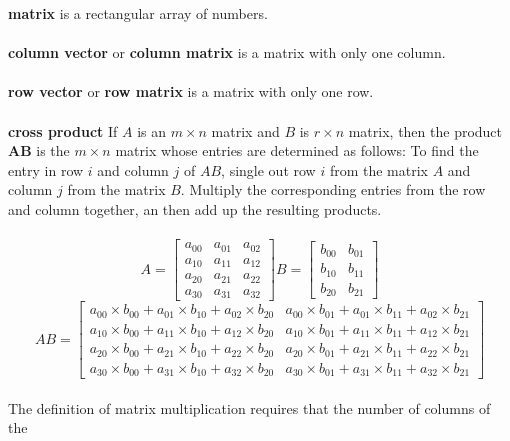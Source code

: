 \documentclass[a4paper, 12pt]{article}
\begin{document}
\textbf{matrix} is a rectangular array of numbers.\\
\\
\textbf{column vector} or \textbf{column matrix} is a matrix with only one column.\\
\\
\textbf{row vector} or \textbf{row matrix} is a matrix with only one row.\\
\\
\textbf{cross product} If $A$ is an $m \times n$ matrix and $B$ is $r \times n$ matrix, 
then the product \textbf{AB}  is the $m \times n$ matrix whose entries are determined 
as follows: To find the entry in row $i$ and column $j$ of $AB$, single out row $i$ 
from the matrix $A$ and column $j$ from the matrix $B$. Multiply the corresponding
entries from the row and column together, an then add up the resulting
products.\\
\\ 
\[ A = \left[ {\begin{array}{ccc}
a_{00} &  a_{01} &  a_{02} \\
a_{10} &  a_{11} &  a_{12} \\
a_{20} &  a_{21} &  a_{22} \\
a_{30} &  a_{31} &  a_{32}
\end{array}}
\right]
B =  \left[ {\begin{array}{cc}
b_{00} &  b_{01} \\
b_{10} &  b_{11} \\
b_{20} &  b_{21} 
\end{array}}
\right] 
\]
\[
AB = \left[ {\begin{array}{cc}
a_{00} \times b_{00} + a_{01} \times b_{10} + a_{02} \times b_{20}   &  a_{00} \times b_{01} + a_{01} \times b_{11} + a_{02} \times b_{21}   \\
a_{10} \times b_{00} + a_{11} \times b_{10} + a_{12} \times b_{20}   &  a_{10} \times b_{01} + a_{11} \times b_{11} + a_{12} \times b_{21}   \\
a_{20} \times b_{00} + a_{21} \times b_{10} + a_{22} \times b_{20}   &  a_{20} \times b_{01} + a_{21} \times b_{11} + a_{22} \times b_{21}   \\
a_{30} \times b_{00} + a_{31} \times b_{10} + a_{32} \times b_{20}   &  a_{30} \times b_{01} + a_{31} \times b_{11} + a_{32} \times b_{21}   

\end{array}}
\right]
\]
\\
The definition of matrix multiplication requires that the number of columns of the 
\end{document}
